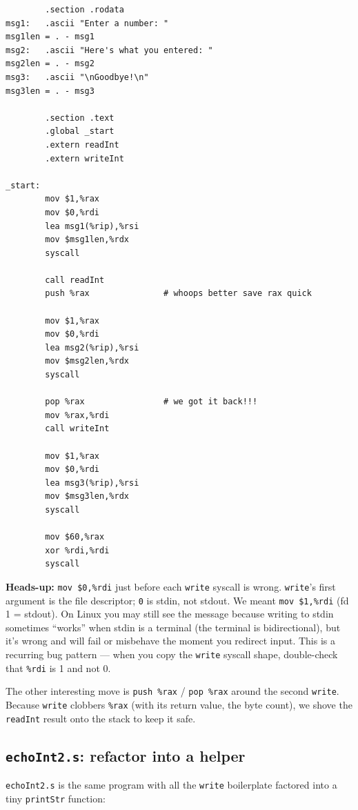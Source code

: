 \documentclass[11pt]{article}
\begin{document}
\begin{lstlisting}
        .section .rodata
msg1:   .ascii "Enter a number: "
msg1len = . - msg1
msg2:   .ascii "Here's what you entered: "
msg2len = . - msg2
msg3:   .ascii "\nGoodbye!\n"
msg3len = . - msg3

        .section .text
        .global _start
        .extern readInt
        .extern writeInt

_start:
        mov $1,%rax
        mov $0,%rdi
        lea msg1(%rip),%rsi
        mov $msg1len,%rdx
        syscall

        call readInt
        push %rax               # whoops better save rax quick

        mov $1,%rax
        mov $0,%rdi
        lea msg2(%rip),%rsi
        mov $msg2len,%rdx
        syscall

        pop %rax                # we got it back!!!
        mov %rax,%rdi
        call writeInt

        mov $1,%rax
        mov $0,%rdi
        lea msg3(%rip),%rsi
        mov $msg3len,%rdx
        syscall

        mov $60,%rax
        xor %rdi,%rdi
        syscall
\end{lstlisting}

\textbf{Heads-up:} \texttt{mov \$0,\%rdi} just before each
\texttt{write} syscall is wrong. \texttt{write}'s first argument is
the file descriptor; \texttt{0} is stdin, not stdout. We meant
\texttt{mov \$1,\%rdi} (fd 1 = stdout). On Linux you may still see
the message because writing to stdin sometimes ``works'' when stdin
is a terminal (the terminal is bidirectional), but it's wrong and
will fail or misbehave the moment you redirect input. This is a
recurring bug pattern --- when you copy the \texttt{write} syscall
shape, double-check that \texttt{\%rdi} is 1 and not 0.

The other interesting move is \texttt{push \%rax} / \texttt{pop \%rax}
around the second \texttt{write}. Because \texttt{write} clobbers
\texttt{\%rax} (with its return value, the byte count), we shove the
\texttt{readInt} result onto the stack to keep it safe.

\subsection*{\texttt{echoInt2.s}: refactor into a helper}

\texttt{echoInt2.s} is the same program with all the \texttt{write}
boilerplate factored into a tiny \texttt{printStr} function:
\end{document}
